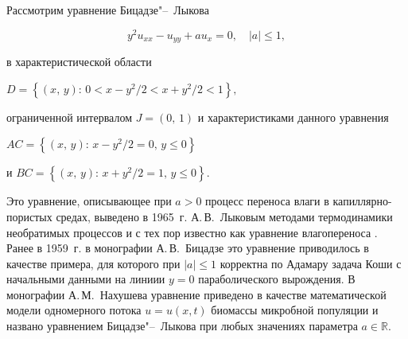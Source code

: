 





Рассмотрим уравнение Бицадзе"--~Лыкова

\begin{equation}

y^2u_{xx}-u_{yy}+au_x=0, \quad |a|\leq 1,

\label{arl:1}

\end{equation}

в характеристической области 

$

D=\left\{(x,\,y):\,0<x-{y^2}/{2}<x+{y^2}/{2}<1\right\},

$

ограниченной интервалом $J=(0,\,1)$ и характеристиками данного уравнения


$AC=\left\{(x,\,y):\,x-{y^2}/{2}=0,\,y\leq 0\right\}$ %

и $BC=\left\{(x,\,y):\,x+{y^2}/{2}=1,\,y\leq 0\right\}$.




Это уравнение, описывающее при $a>0$ процесс переноса влаги в капил\-ляр\-но-пористых средах, выведено в 1965~г. А.\,В.~Лыковым методами термодинамики необратимых процессов и с тех пор известно как уравнение влагопереноса \cite{arl:bib:13}. Ранее в 1959~г. в монографии А.\,В.~Бицадзе \cite{arl:bib:14} это уравнение приводилось в качестве примера, для которого при $|a|\leq1$ корректна по Адамару задача Коши с начальными данными на линиии $y=0$ параболического вырождения. В монографии А.\,М.~Нахушева \cite{arl:bib:15} уравнение приведено в качестве математической модели одномерного потока $u=u(x,t)$ биомассы микробной популяции и названо уравнением Бицадзе"--~Лыкова при любых значениях параметра $a\in\mathbb{R}$.



